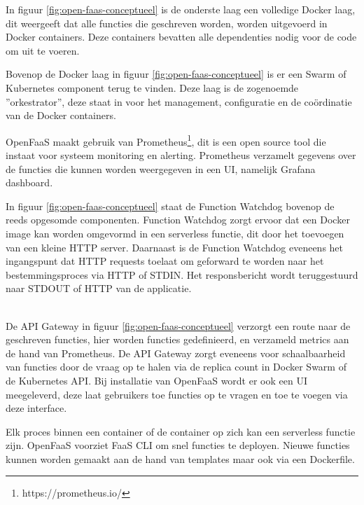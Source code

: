 \begin{description}[style=unboxed, labelwidth=\linewidth, listparindent =0pt]
    \item[Docker laag]
    In figuur \ref{fig:open-faas-conceptueel} is de onderste laag een volledige Docker laag, dit weergeeft dat alle functies die geschreven worden, worden uitgevoerd in Docker containers. Deze containers bevatten alle dependenties nodig voor de code om uit te voeren.
    \\
    
    \item[Swarm/Kubernetes]
    Bovenop de Docker laag in figuur \ref{fig:open-faas-conceptueel} is er een Swarm of Kubernetes component terug te vinden. Deze laag is de zogenoemde ''orkestrator'', deze staat in voor het management, configuratie en de coördinatie van de Docker containers.
    \\
    
    \item[Prometheus]
    OpenFaaS maakt gebruik van Prometheus\footnote{https://prometheus.io/}, dit is een open source tool die instaat voor systeem monitoring en alerting. Prometheus verzamelt gegevens over de functies die kunnen worden weergegeven in een UI, namelijk Grafana dashboard.
    \\
    
    \item[Function Watchdog]
    In figuur \ref{fig:open-faas-conceptueel} staat de Function Watchdog bovenop de reeds opgesomde componenten. Function Watchdog zorgt ervoor dat een Docker image kan worden omgevormd in een serverless functie, dit door het toevoegen van een kleine HTTP server. Daarnaast is de Function Watchdog eveneens het ingangspunt dat HTTP requests toelaat om geforward te worden naar het bestemmingsproces via HTTP of STDIN. Het responsbericht wordt teruggestuurd naar STDOUT of HTTP van de applicatie. \autocite{Ellis2019}
    \\
    \\
    
    \item[API Gateway/UI Portal]
    De API Gateway in figuur \ref{fig:open-faas-conceptueel} verzorgt een route naar de geschreven functies, hier worden functies gedefinieerd, en verzameld metrics aan de hand van Prometheus. De API Gateway zorgt eveneens voor schaalbaarheid van functies door de vraag op te halen via de replica count in Docker Swarm of de Kubernetes API. Bij installatie van OpenFaaS wordt er ook een UI meegeleverd, deze laat gebruikers toe functies op te vragen en toe te voegen via deze interface. \autocite{Ellis2019} 
    \\
    
    \item[CLI]
    Elk proces binnen een container of de container op zich kan een serverless functie zijn. OpenFaaS voorziet FaaS CLI om snel functies te deployen. Nieuwe functies kunnen worden gemaakt aan de hand van templates maar ook via een Dockerfile. \autocite{Ellis2019}  
\end{description}

